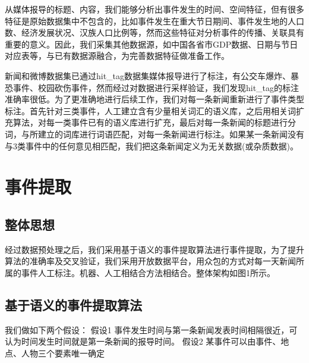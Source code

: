 \documentclass[a4paper,10pt]{article}
\begin{document}
从媒体报导的标题、内容，我们能够分析出事件发生的时间、空间特征，但有很多特征是原始数据集中不包含的，比如事件发生在重大节日期间、事件发生地的人口数、经济发展状况、汉族人口比例等，然而这些特征对分析事件的传播、关联具有重要的意义。因此，我们采集其他数据源，如中国各省市GDP数据、日期与节日对应表等，与已有数据源融合，为完善数据特征做准备工作。

新闻和微博数据集已通过hit\_tag数据集媒体报导进行了标注，有公交车爆炸、暴恐事件、校园砍伤事件，然而经过对数据进行采样验证，我们发现hit\_tag的标注准确率很低。为了更准确地进行后续工作，我们对每一条新闻重新进行了事件类型标注。首先针对三类事件，人工建立含有少量相关词汇的语义库，之后用相关词扩充算法，对每一类事件已有的语义库进行扩充，最后对每一条新闻的标题进行分词，与所建立的词库进行词语匹配，对每一条新闻进行标注。如果某一条新闻没有与3类事件中的任何意见相匹配，我们把这条新闻定义为无关数据(或杂质数据)。

\section{事件提取}

\subsection{整体思想}

经过数据预处理之后，我们采用基于语义的事件提取算法进行事件提取，为了提升算法的准确率及交叉验证，我们采用开放数据平台，用众包的方式对每一天新闻所属的事件人工标注。机器、人工相结合方法相结合。整体架构如图1所示。

\subsection{基于语义的事件提取算法}

我们做如下两个假设：
假设1 事件发生时间与第一条新闻发表时间相隔很近，可认为时间发生时间就是第一条新闻的报导时间。
假设2 某事件可以由事件、地点、人物三个要素唯一确定
\end{document}

